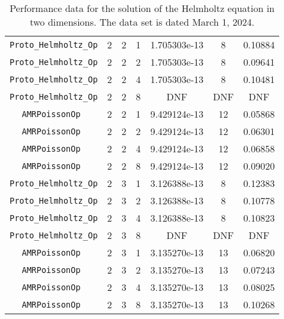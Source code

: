 \documentclass{article}
\begin{document}
\begin{small}
\begin{table}
\begin{center}
\begin{tabular}{|c|c|c|c|c|c||c|}
\hline                                                                                
 {\tt Proto\_Helmholtz\_Op} & 2 & 2   & 1    & 1.705303e-13   &   8   &  0.10884   \\
 {\tt Proto\_Helmholtz\_Op} & 2 & 2   & 2    & 1.705303e-13   &   8   &  0.09641   \\
 {\tt Proto\_Helmholtz\_Op} & 2 & 2   & 4    & 1.705303e-13   &   8   &  0.10481   \\
 {\tt Proto\_Helmholtz\_Op} & 2 & 2   & 8    & DNF   &  DNF    &  DNF   \\
\hline                                                                                
 {\tt AMRPoissonOp        } & 2 & 2   & 1    & 9.429124e-13   &  12    &  0.05868  \\
 {\tt AMRPoissonOp        } & 2 & 2   & 2    & 9.429124e-13   &  12    &  0.06301  \\
 {\tt AMRPoissonOp        } & 2 & 2   & 4    & 9.429124e-13   &  12    &  0.06858  \\
 {\tt AMRPoissonOp        } & 2 & 2   & 8    & 9.429124e-13   &  12    &  0.09020  \\
 \hline                                                                               
 {\tt Proto\_Helmholtz\_Op} & 2 & 3   & 1    & 3.126388e-13   &  8    &  0.12383   \\
 {\tt Proto\_Helmholtz\_Op} & 2 & 3   & 2    & 3.126388e-13   &  8    &  0.10778   \\
 {\tt Proto\_Helmholtz\_Op} & 2 & 3   & 4    & 3.126388e-13   &  8    &  0.10823   \\
 {\tt Proto\_Helmholtz\_Op} & 2 & 3   & 8    & DNF   &  DNF    &  DNF   \\
\hline                                                                                
 {\tt AMRPoissonOp        } & 2 & 3   & 1    &  3.135270e-13  &   13   & 0.06820   \\
 {\tt AMRPoissonOp        } & 2 & 3   & 2    &  3.135270e-13  &   13   & 0.07243   \\
 {\tt AMRPoissonOp        } & 2 & 3   & 4    &  3.135270e-13  &   13   & 0.08025   \\
 {\tt AMRPoissonOp        } & 2 & 3   & 8    &  3.135270e-13  &   13   & 0.10268   \\
 \hline
\end{tabular}
\end{center}
\label{tab::1}
\caption
    {
      Performance data for the solution of the Helmholtz
      equation in two dimensions.    
      The data set is dated March 1, 2024.
    }
\end{table}
\end{small}
\end{document}

